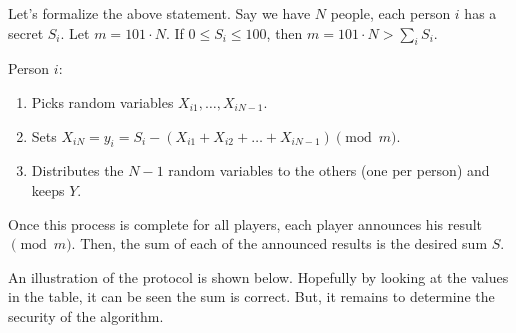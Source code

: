 \documentclass[14pt]{extreport}
\begin{document}
    \vspace{2mm}
    Let's formalize the above statement. Say we have $N$ people, each person $i$ has a secret $S_{i}$. Let $m = 101 \cdot N$. If $0 \le S_{i} \le 100$, then $m = 101 \cdot N > \sum_{i}S_{i}$. 

    \vspace{2mm}
    Person $i$: 
    \begin{enumerate}[label=\arabic*.]
        \item Picks random variables $X_{i1}, \dots, X_{iN - 1}$.
        \item Sets $X_{iN} = y_{i} = S_{i} - (X_{i1} + X_{i2} + \dots + X_{iN - 1}) \pmod{m}$.
        \item Distributes the $N - 1$ random variables to the others (one per person) and keeps $Y$.
    \end{enumerate}
    Once this process is complete for all players, each player announces his result $\pmod{m}$. Then, the sum of each of the announced results is the desired sum $S$.

    \vspace{2mm}
    An illustration of the protocol is shown below. Hopefully by looking at the values in the table, it can be seen the sum is correct. But, it remains to determine the security of the algorithm.
\end{document}
